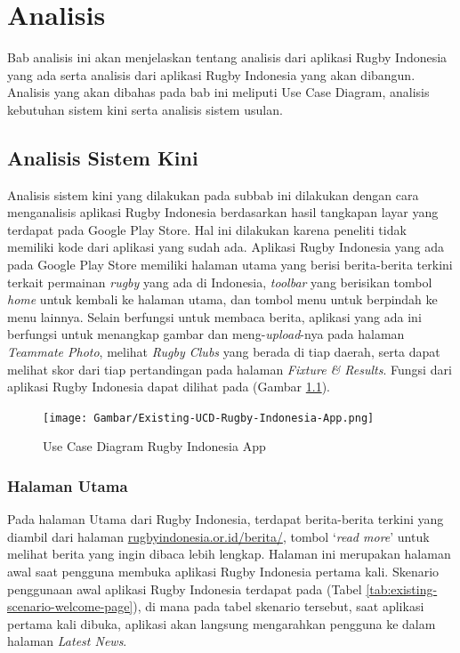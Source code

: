 \chapter{Analisis}
\label{chap:analisis}

Bab analisis ini akan menjelaskan tentang analisis dari aplikasi Rugby Indonesia yang ada serta analisis dari aplikasi Rugby Indonesia yang akan dibangun. Analisis yang akan dibahas pada bab ini meliputi Use Case Diagram, analisis kebutuhan sistem kini serta analisis sistem usulan.

\section{Analisis Sistem Kini}
Analisis sistem kini yang dilakukan pada subbab ini dilakukan dengan cara menganalisis aplikasi Rugby Indonesia berdasarkan hasil tangkapan layar yang terdapat pada Google Play Store. Hal ini dilakukan karena peneliti tidak memiliki kode dari aplikasi yang sudah ada. Aplikasi Rugby Indonesia yang ada pada Google Play Store memiliki halaman utama yang berisi berita-berita terkini terkait permainan \textit{rugby} yang ada di Indonesia, \textit{toolbar} yang berisikan tombol \textit{home} untuk kembali ke halaman utama, dan tombol menu untuk berpindah ke menu lainnya. Selain berfungsi untuk membaca berita, aplikasi yang ada ini berfungsi untuk menangkap gambar dan meng-\textit{upload}-nya pada halaman \textit{Teammate Photo}, melihat \textit{Rugby Clubs} yang berada di tiap daerah, serta dapat melihat skor dari tiap pertandingan pada halaman \textit{Fixture \& Results}. Fungsi dari aplikasi Rugby Indonesia dapat dilihat pada (Gambar \ref{fig:ucd-rugby-indonesia-app}).

\begin{figure} [H]
    \centering
    \texttt{[image: Gambar/Existing-UCD-Rugby-Indonesia-App.png]}
    \caption{Use Case Diagram Rugby Indonesia App}
    \label{fig:ucd-rugby-indonesia-app}
\end{figure}

\subsection{Halaman Utama}
Pada halaman Utama dari Rugby Indonesia, terdapat berita-berita terkini yang diambil dari halaman \url{rugbyindonesia.or.id/berita/}, tombol `\textit{read more}' untuk melihat berita yang ingin dibaca lebih lengkap. Halaman ini merupakan halaman awal saat pengguna membuka aplikasi Rugby Indonesia pertama kali. Skenario penggunaan awal aplikasi Rugby Indonesia terdapat pada (Tabel \ref{tab:existing-scenario-welcome-page}), di mana pada tabel skenario tersebut, saat aplikasi pertama kali dibuka, aplikasi akan langsung mengarahkan pengguna ke dalam halaman\textit{ Latest News}.

